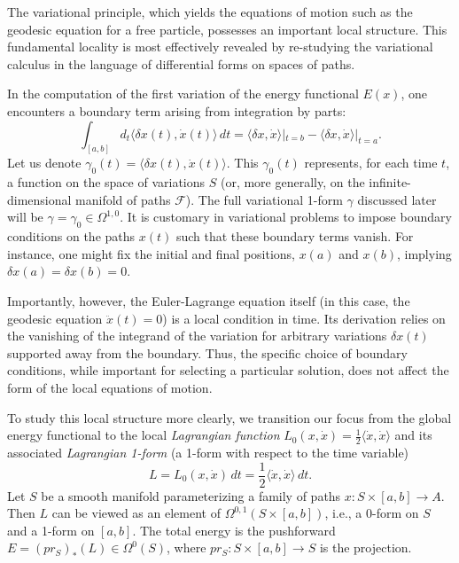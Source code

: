 The variational principle, which yields the equations of motion such as the geodesic equation for a free particle, possesses an important local structure. This fundamental locality is most effectively revealed by re-studying the variational calculus in the language of differential forms on spaces of paths.

\begin{remark}
\label{rem:boundary_locality}
In the computation of the first variation of the energy functional $E(x)$, one encounters a boundary term arising from integration by parts:
\begin{equation}
\int_{[a,b]} d_t \langle \delta x(t), \dot{x}(t) \rangle \, dt = \langle \delta x, \dot{x} \rangle|_{t=b} - \langle \delta x, \dot{x} \rangle|_{t=a}.
\end{equation}
Let us denote $\gamma_0(t) = \langle \delta x(t), \dot{x}(t) \rangle$. This $\gamma_0(t)$ represents, for each time $t$, a function on the space of variations $S$ (or, more generally, on the infinite-dimensional manifold of paths $\mathcal{F}$). The full variational 1-form $\gamma$ discussed later will be $\gamma = \gamma_0 \in \Omega^{1,0}$. It is customary in variational problems to impose boundary conditions on the paths $x(t)$ such that these boundary terms vanish. For instance, one might fix the initial and final positions, $x(a)$ and $x(b)$, implying $\delta x(a) = \delta x(b) = 0$.

Importantly, however, the Euler-Lagrange equation itself (in this case, the geodesic equation $\ddot{x}(t)=0$) is a local condition in time. Its derivation relies on the vanishing of the integrand of the variation for arbitrary variations $\delta x(t)$ supported away from the boundary. Thus, the specific choice of boundary conditions, while important for selecting a particular solution, does not affect the form of the local equations of motion.
\end{remark}

To study this local structure more clearly, we transition our focus from the global energy functional to the local \textit{Lagrangian function} $L_0(x,\dot{x}) = \frac{1}{2}\langle \dot{x}, \dot{x} \rangle$ and its associated \textit{Lagrangian 1-form} (a 1-form with respect to the time variable)
\begin{equation}
\label{eq:lagrangian_form}
L = L_0(x,\dot{x}) \, dt = \frac{1}{2}\langle \dot{x}, \dot{x} \rangle \, dt.
\end{equation}
Let $S$ be a smooth manifold parameterizing a family of paths $x: S \times [a,b] \to A$. Then $L$ can be viewed as an element of $\Omega^{0,1}(S \times [a,b])$, i.e., a 0-form on $S$ and a 1-form on $[a,b]$. The total energy is the pushforward $E = (pr_S)_*(L) \in \Omega^0(S)$, where $pr_S: S \times [a,b] \to S$ is the projection.

